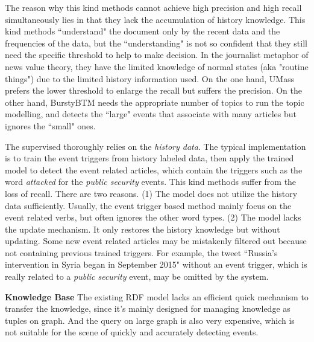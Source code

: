 \documentclass{article}
\begin{document}
The reason why this kind methods cannot achieve high precision and high recall simultaneously lies in that they lack the accumulation of history knowledge. 
This kind methods ``understand" the document only by the recent data and the frequencies of the data, but the ``understanding" is not so confident that they still need the specific threshold to help to make decision. In the journalist metaphor of news value theory, they have the limited knowledge of normal states (aka "routine things") due to the limited history information used. 
On the one hand, UMass\cite{Allan:2000wu} prefers the lower threshold to enlarge the recall but suffers the precision. 
On the other hand, BurstyBTM needs the appropriate number of topics to run the topic modelling, and detects the ``large" events that associate with many articles but ignores the ``small" ones. 


The supervised thoroughly relies on the \textit{history data}. 
The typical implementation is to train the event triggers\cite{Li2013JointEE}\cite{Nguyen2015EventDA} from history labeled data, then apply the trained model to detect the event related articles, which contain the triggers such as the word \textit{attacked} for the \textit{public security} events. 
This kind methods suffer from the loss of recall. 
There are two reasons. 
(1) The model does not utilize the history data sufficiently. 
Usually, the event trigger based method mainly focus on the event related verbs, but often ignores the other word types.
(2) The model lacks the update mechanism. 
It only restores the history knowledge but without updating. 
Some new event related articles may be mistakenly filtered out because not containing previous trained triggers. 
For example, the tweet ``Russia's intervention in Syria began in September 2015" without an event trigger, which is really related to a \textit{public security} event, may be omitted by the system. 

\textbf{Knowledge Base} The existing RDF model\cite{klyne2006rdf} lacks an efficient quick mechanism to transfer the knowledge, since it's mainly designed for managing knowledge as tuples on graph. And the query on large graph is also very expensive\cite{huang2011scalable}, which is not suitable for the scene of quickly and accurately detecting events.




\end{document}
